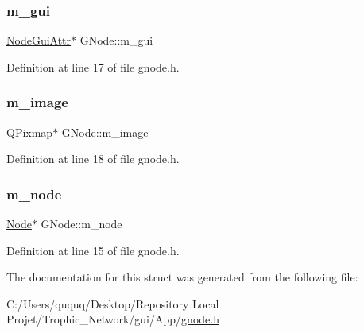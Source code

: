 \subsubsection{\texorpdfstring{m\+\_\+gui}{m\_gui}}
{\footnotesize\ttfamily \mbox{\hyperlink{struct_node_gui_attr}{Node\+Gui\+Attr}}$\ast$ G\+Node\+::m\+\_\+gui}



Definition at line 17 of file gnode.\+h.

\mbox{\label{struct_g_node_a77e0c9572f6f27150ed75b3a55120d08}} 
\subsubsection{\texorpdfstring{m\+\_\+image}{m\_image}}
{\footnotesize\ttfamily Q\+Pixmap$\ast$ G\+Node\+::m\+\_\+image}



Definition at line 18 of file gnode.\+h.

\mbox{\label{struct_g_node_a1f5acd0ae89f506fdbd8674b0cda648c}} 
\subsubsection{\texorpdfstring{m\+\_\+node}{m\_node}}
{\footnotesize\ttfamily \mbox{\hyperlink{class_node}{Node}}$\ast$ G\+Node\+::m\+\_\+node}



Definition at line 15 of file gnode.\+h.



The documentation for this struct was generated from the following file\+:\begin{DoxyCompactItemize}
\item 
C\+:/\+Users/ququq/\+Desktop/\+Repository Local Projet/\+Trophic\+\_\+\+Network/gui/\+App/\mbox{\hyperlink{gnode_8h}{gnode.\+h}}\end{DoxyCompactItemize}
